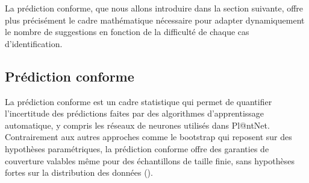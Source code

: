 \documentclass[a4paper,12pt]{article}
\begin{document}
\vspace{0.2cm}

La prédiction conforme, que nous allons introduire dans la section suivante, offre plus précisément le cadre mathématique nécessaire pour adapter dynamiquement le nombre de suggestions en fonction de la difficulté de chaque cas d'identification.


\subsection{Prédiction conforme}

La prédiction conforme est un cadre statistique qui permet de quantifier l'incertitude des prédictions faites par des algorithmes d'apprentissage automatique, y compris les réseaux de neurones utilisés dans Pl@ntNet. Contrairement aux autres approches comme le bootstrap qui reposent sur des hypothèses paramétriques, la prédiction conforme offre des garanties de couverture valables même pour des échantillons de taille finie, sans hypothèses fortes sur la distribution des données (\cite{ShaferVovk}).

\vspace{0.2cm}
\end{document}
